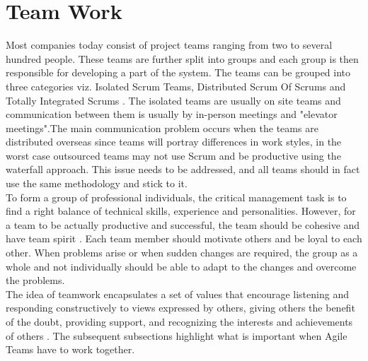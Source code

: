 \documentclass[sigplan,screen]{acmart}
\begin{document}
\section{Team Work}
Most companies today consist of project teams ranging from two to several hundred people. These teams are further split into groups and each group is then responsible for developing a part of the system. The teams can be grouped into three categories viz. Isolated Scrum Teams, Distributed Scrum Of Scrums and Totally Integrated Scrums \cite{Jeff}. 
The isolated teams are usually on site teams and communication between them is usually by in-person meetings and "elevator meetings".The main communication problem occurs when the teams are distributed overseas since teams will portray differences in work styles, in the worst case outsourced teams may not use Scrum and be productive using the waterfall approach. This issue needs to be addressed, and all teams should in fact use the same methodology and stick to it.\\
To form a group of professional individuals, the critical management task is to find a right balance of technical skills, experience and personalities. However, for a team to be actually productive and successful, the team should be cohesive and have team spirit \cite{Somerville}. Each team member should motivate others and  be loyal to each other. When problems arise or when sudden changes are required, the group as a whole and not individually should be able to adapt to the changes and overcome the problems.\\
The idea of teamwork encapsulates a set of values that encourage listening and responding constructively to views expressed by others, giving others the benefit of the doubt, providing support, and recognizing the interests and achievements of others \cite{Moe}.
The subsequent subsections highlight what is important when Agile Teams have to work together. 
\end{document}

